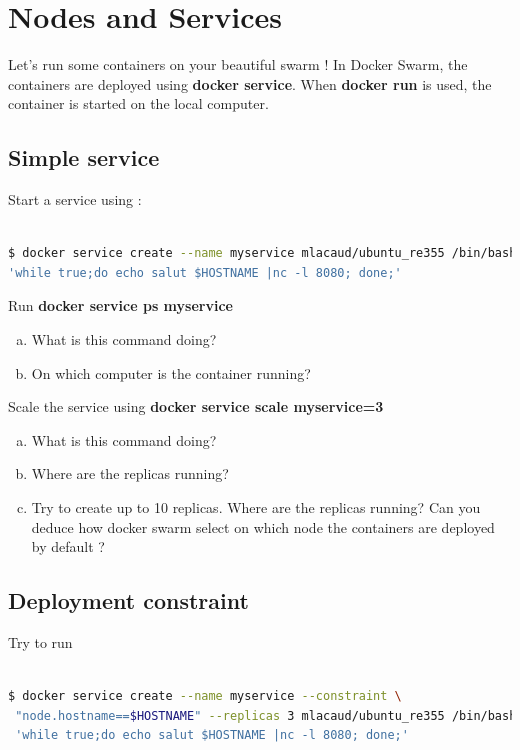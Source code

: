 \documentclass[a4paper,11pt]{exam}
\begin{document}
\section{Nodes and Services}

Let's run some containers on your beautiful swarm ! In Docker Swarm, 
the containers are deployed using \textbf{docker service}. 
When \textbf{docker run} is used, the container is started 
on the local computer.
\subsection{Simple service}
Start a service using : 
\begin{lstlisting}[frame=single,language={sh}]  % Start your code-block

$ docker service create --name myservice mlacaud/ubuntu_re355 /bin/bash -c \
'while true;do echo salut $HOSTNAME |nc -l 8080; done;'

\end{lstlisting}

\begin{questions}
	\question Run \textbf{docker service ps myservice}
	\begin{enumerate}[(a)]
		\item What is this command doing?
		\item On which computer is the container running?
	\end{enumerate}
Scale the service using \textbf{docker service scale myservice=3}
	\begin{enumerate}[(c)]
		\item What is this command doing?
		\item Where are the replicas running?
		\item Try to create up to 10 replicas. Where are the replicas running? Can you deduce how docker swarm select on which node the containers are deployed by default ? 
	\end{enumerate}
\end{questions}

\subsection{Deployment constraint}

Try to run 
\begin{lstlisting}[frame=single,language={sh}]  % Start your code-block

$ docker service create --name myservice --constraint \
 "node.hostname==$HOSTNAME" --replicas 3 mlacaud/ubuntu_re355 /bin/bash -c \
 'while true;do echo salut $HOSTNAME |nc -l 8080; done;'
\end{lstlisting}
\end{document}
